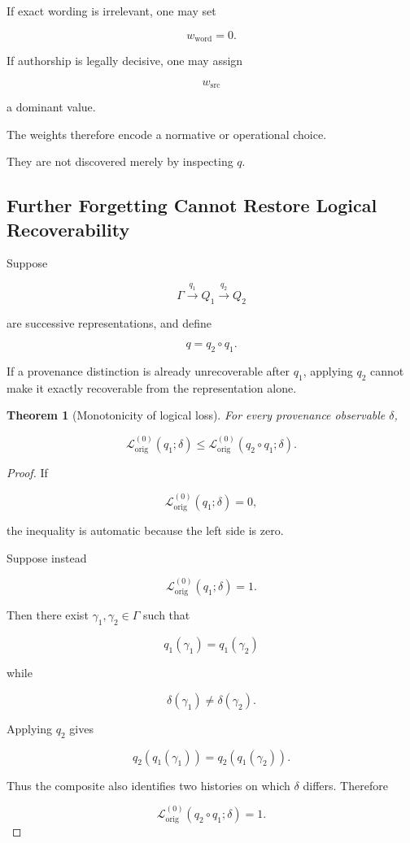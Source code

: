 \documentclass[
  11pt,
  a4paper,
  DIV=12,
  BCOR=0mm,
  parskip=half-
]{scrartcl}
\newcommand{\lossorig}{%
  \mathscr L_{\mathrm{orig}}%
}
\theoremstyle{definition}
\theoremstyle{plain}
\newtheorem{theorem}[definition]{Theorem}
\theoremstyle{remark}
\begin{document}
If exact wording is irrelevant, one may set

\[
  w_{\mathrm{word}}=0.
\]

If authorship is legally decisive, one may assign

\[
  w_{\mathrm{src}}
\]

a dominant value.

The weights therefore encode a normative or operational choice.

They are not discovered merely by inspecting \(q\).


\subsection{Further Forgetting Cannot Restore Logical Recoverability}
\label{app:monotonicity}

Suppose

\[
  \Gamma
  \xrightarrow{q_1}
  Q_1
  \xrightarrow{q_2}
  Q_2
\]

are successive representations, and define

\[
  q=q_2\circ q_1.
\]

If a provenance distinction is already unrecoverable after \(q_1\), applying
\(q_2\) cannot make it exactly recoverable from the representation alone.

\begin{theorem}[Monotonicity of logical loss]
\label{thm:logical-loss-monotonicity}
For every provenance observable \(\delta\),

\[
  \lossorig^{(0)}(q_1;\delta)
  \leq
  \lossorig^{(0)}(q_2\circ q_1;\delta).
\]
\end{theorem}

\begin{proof}
If

\[
  \lossorig^{(0)}(q_1;\delta)=0,
\]

the inequality is automatic because the left side is zero.

Suppose instead

\[
  \lossorig^{(0)}(q_1;\delta)=1.
\]

Then there exist \(\gamma_1,\gamma_2\in\Gamma\) such that

\[
  q_1(\gamma_1)=q_1(\gamma_2)
\]

while

\[
  \delta(\gamma_1)\neq\delta(\gamma_2).
\]

Applying \(q_2\) gives

\[
  q_2(q_1(\gamma_1))
  =
  q_2(q_1(\gamma_2)).
\]

Thus the composite also identifies two histories on which \(\delta\) differs.
Therefore

\[
  \lossorig^{(0)}(q_2\circ q_1;\delta)=1.
\]
\end{proof}
\end{document}
